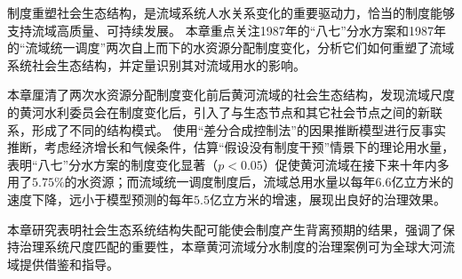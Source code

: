 制度重塑社会\textendash{}生态结构，是流域系统人\textendash{}水关系变化的重要驱动力，恰当的制度能够支持流域高质量、可持续发展。
本章重点关注1987年的``八七''分水方案和1987年的“流域统一调度”两次自上而下的水资源分配制度变化，分析它们如何重塑了流域系统社会\textendash{}生态结构，并定量识别其对流域用水的影响。

本章厘清了两次水资源分配制度变化前后黄河流域的社会\textendash{}生态结构，发现流域尺度的黄河水利委员会在制度变化后，引入了与生态节点和其它社会节点之间的新联系，形成了不同的结构模式。
使用“差分合成控制法”的因果推断模型进行反事实推断，考虑经济增长和气候条件，估算“假设没有制度干预”情景下的理论用水量，表明``八七''分水方案的制度变化显著（$p<0.05$）促使黄河流域在接下来十年内多用了$5.75\%$的水资源；而流域统一调度制度后，流域总用水量以每年$6.6$亿立方米的速度下降，远小于模型预测的每年$5.5$亿立方米的增速，展现出良好的治理效果。

本章研究表明社会\textendash{}生态系统结构失配可能使会制度产生背离预期的结果，强调了保持治理系统尺度匹配的重要性，本章黄河流域分水制度的治理案例可为全球大河流域提供借鉴和指导。
